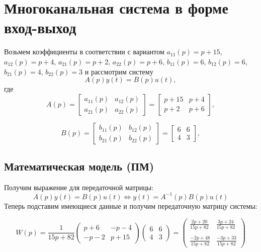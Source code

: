 \documentclass[a5paper, 10pt]{article}
\theoremstyle{definition}
\theoremstyle{plain}
\theoremstyle{remark}
\begin{document}
\section{Многоканальная система в форме вход-выход}
Возьмем коэффициенты в соответствии с вариантом $a_{11}(p)=p+15$,  $a_{12}(p)=p+4$,  $a_{21}(p)=p+2$,  $a_{22}(p)=p+6$,  $b_{11}(p)=6$,  $b_{12}(p)=6$,  $b_{21}(p)=4$,  $b_{22}(p)=3$ и рассмотрим систему
\begin{equation*}
A(p)y(t)=B(p)u(t),
\end{equation*}
где
\begin{equation*}
A(p) = 
\begin{bmatrix}
a_{11}(p) & a_{12}(p)\\
a_{21}(p) & a_{22}(p)
\end{bmatrix}
=
\begin{bmatrix}
p+15 &p+4\\
p+2 & p+6
\end{bmatrix},
\end{equation*}


\begin{equation*}
B(p) = 
\begin{bmatrix}
b_{11}(p) & b_{12}(p)\\
b_{21}(p) & b_{22}(p)
\end{bmatrix}
=
\begin{bmatrix}
6 &6\\
4 & 3
\end{bmatrix},
\end{equation*}

\subsection{Математическая модель (ПМ)}
Получим выражение для передаточной матрицы:
\begin{equation*}
A(p)y(t)=B(p)u(t) \Leftrightarrow y(t) = A^{-1}(p) B(p)u(t)
\end{equation*}
Теперь подставим имеющиеся данные и получим передаточную матрицу системы:

\begin{equation*}
W(p) = 
\frac{1}{15p+82}
\begin{pmatrix}
p+6 &-p-4\\
-p-2 & p+15
\end{pmatrix}
\begin{pmatrix}
6 &6\\
4 & 3
\end{pmatrix}
=
\begin{pmatrix}
\frac{2p+20}{15p+82} & \frac{3p+24}{15p+82}\\\\
\frac{-2p+48}{15p+82} & \frac{-3p+33}{15p+82}
\end{pmatrix}
\end{equation*}
\end{document}
